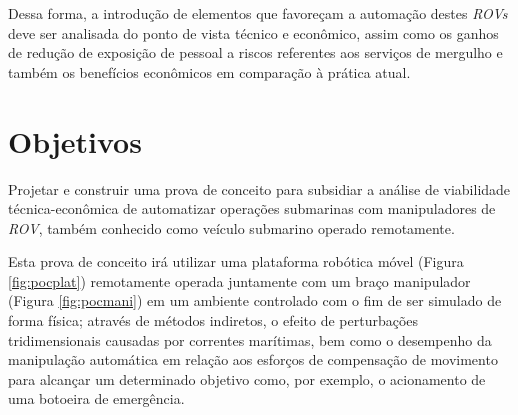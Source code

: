 Dessa forma, a introdução de elementos que favoreçam a automação destes \textit{\acs{ROV}s} deve ser analisada do ponto de vista técnico e econômico, assim como os ganhos de redução de exposição de pessoal a riscos referentes aos serviços de mergulho e também os benefícios econômicos em comparação à prática atual. 

\section{Objetivos}
\label{sec:obj}
Projetar e construir uma prova de conceito para subsidiar a análise de viabilidade técnica-econômica de automatizar operações submarinas com manipuladores de \textit{\acs{ROV}}, também conhecido como veículo submarino operado remotamente.

Esta prova de conceito irá utilizar uma plataforma robótica móvel (Figura \ref{fig:pocplat}) remotamente operada juntamente com um braço manipulador (Figura \ref{fig:pocmani}) em um ambiente controlado com o fim de ser simulado de forma física; através de métodos indiretos, o efeito de perturbações tridimensionais causadas por correntes marítimas, bem como o desempenho da manipulação automática em relação aos esforços de compensação de movimento para alcançar um determinado objetivo como, por exemplo, o acionamento de uma botoeira de emergência.
 
